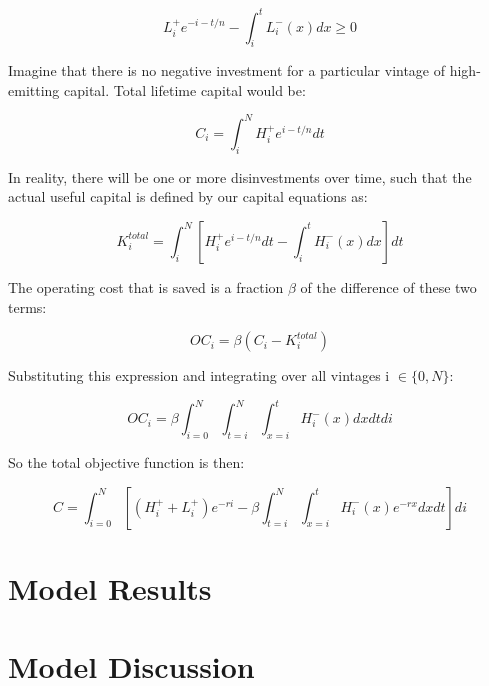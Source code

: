 \documentclass[singlespace]{easychithesis}
\begin{document}
\begin{equation}
L_i^+ e^{-i-t/n} - \int_i^t L^-_i(x)dx \geq 0
\end{equation}



Imagine that there is no negative investment for a particular vintage of high-emitting capital. Total lifetime capital would be:

\begin{equation}
C_i = \int_i^N H^+_i e^{i-t/n}dt
\end{equation}

In reality, there will be one or more disinvestments over time, such that the actual useful capital is defined by our capital equations as:

\begin{equation}
K^{total}_i = \int_i^N \left[H^+_i e^{i-t/n} dt - \int_i^t H^-_i(x)dx \right] dt
\end{equation}

The operating cost that is saved is a fraction $\beta$ of the difference of these two terms:

\begin{equation}
OC_i = \beta (C_i - K^{total}_i)
\end{equation}


Substituting this expression and integrating over all vintages  i $\in \{0,N\}$:

\begin{equation}
OC_i = \beta \int_{i=0}^N \int_{t=i}^N \int_{x=i}^t H^-_i(x) dx dt di
\end{equation}

So the total objective function is then:

\begin{equation}
C = \int_{i=0}^N  \left[ (H^+_i + L^+_i)e^{-ri}  - \beta  \int_{t=i}^N \int_{x=i}^t H^-_i(x)e^{-rx} dx dt\right] di
\end{equation}






\section{Model Results}

\section{Model Discussion}


\end{document}
